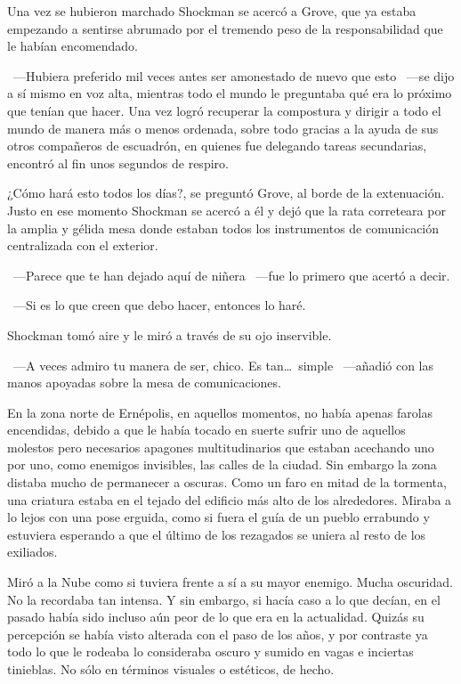 Una vez se hubieron marchado Shockman se acercó a Grove, que ya estaba empezando a sentirse abrumado por el tremendo peso de la responsabilidad que le habían encomendado.

~---Hubiera preferido mil veces antes ser amonestado de nuevo que esto ~---se dijo a sí mismo en voz alta, mientras todo el mundo le preguntaba qué era lo próximo que tenían que hacer. Una vez logró recuperar la compostura y dirigir a todo el mundo de manera más o menos ordenada, sobre todo gracias a la ayuda de sus otros compañeros de escuadrón, en quienes fue delegando tareas secundarias, encontró al fin unos segundos de respiro.

¿Cómo hará esto todos los días?, se preguntó Grove, al borde de la extenuación. Justo en ese momento Shockman se acercó a él y dejó que la rata correteara por la amplia y gélida mesa donde estaban todos los instrumentos de comunicación centralizada con el exterior.

~---Parece que te han dejado aquí de niñera ~---fue lo primero que acertó a decir.

~---Si es lo que creen que debo hacer, entonces lo haré.

Shockman tomó aire y le miró a través de su ojo inservible.

~---A veces admiro tu manera de ser, chico. Es tan\dots\ simple ~---añadió con las manos apoyadas sobre la mesa de comunicaciones.

\parbreak
En la zona norte de Ernépolis, en aquellos momentos, no había apenas farolas encendidas, debido a que le había tocado en suerte sufrir uno de aquellos molestos pero necesarios apagones multitudinarios que estaban acechando uno por uno, como enemigos invisibles, las calles de la ciudad. Sin embargo la zona distaba mucho de permanecer a oscuras. Como un faro en mitad de la tormenta, una criatura estaba en el tejado del edificio más alto de los alrededores. Miraba a lo lejos con una pose erguida, como si fuera el guía de un pueblo errabundo y estuviera esperando a que el último de los rezagados se uniera al resto de los exiliados.

Miró a la Nube como si tuviera frente a sí a su mayor enemigo. Mucha oscuridad. No la recordaba tan intensa. Y sin embargo, si hacía caso a lo que decían, en el pasado había sido incluso aún peor de lo que era en la actualidad. Quizás su percepción se había visto alterada con el paso de los años, y por contraste ya todo lo que le rodeaba lo consideraba oscuro y sumido en vagas e inciertas tinieblas. No sólo en términos visuales o estéticos, de hecho.

